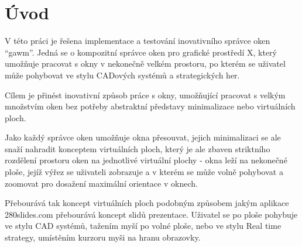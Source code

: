 \documentclass[12pt,a4paper,titlepage,final]{article}
\begin{document}



\pagestyle{plain}
\setcounter{page}{1}

\newpage
\pagestyle{plain}
\setcounter{page}{1}


\section{Úvod} \label{uvod}

V této práci je řešena implementace a testování inovativního správce oken ``gawm''.
Jedná se o kompozitní správce oken pro grafické prostředí X, který umožňuje pracovat s okny v nekonečně velkém prostoru, po kterém se uživatel může pohybovat ve stylu CADových systémů a strategických her.

Cílem je přinést inovativní způsob práce s okny, umožňující pracovat s velkým množstvím oken bez potřeby abstraktní představy minimalizace nebo virtuálních ploch.

Jako každý správce oken umožňuje okna přesouvat, jejich minimalizaci se ale snaží nahradit konceptem virtuálních ploch, který je ale zbaven striktního rozdělení prostoru oken na jednotlivé virtuální plochy - okna leží na nekonečné ploše, jejíž výřez se uživateli zobrazuje a v kterém se může volně pohybovat a zoomovat pro dosažení maximální orientace v oknech.

Přebourává tak koncept virtuálních ploch podobným způsobem jakým aplikace 280slides.com přebourává koncept slidů prezentace.
Uživatel se po ploše pohybuje ve stylu CAD systémů, tažením myší po volné ploše, nebo ve stylu Real time strategy, umístěním kurzoru myši na hranu obrazovky.
\end{document}
